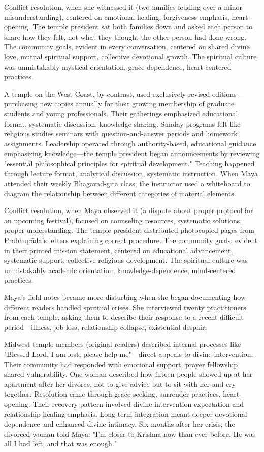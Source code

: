 \documentclass[12pt,twoside]{book}
\begin{document}
Conflict resolution, when she witnessed it (two families feuding over a minor misunderstanding), centered on emotional healing, forgiveness emphasis, heart-opening. The temple president sat both families down and asked each person to share how they felt, not what they thought the other person had done wrong. The community goals, evident in every conversation, centered on shared divine love, mutual spiritual support, collective devotional growth. The spiritual culture was unmistakably mystical orientation, grace-dependence, heart-centered practices.

A temple on the West Coast, by contrast, used exclusively revised editions—purchasing new copies annually for their growing membership of graduate students and young professionals. Their gatherings emphasized educational format, systematic discussion, knowledge-sharing. Sunday programs felt like religious studies seminars with question-and-answer periods and homework assignments. Leadership operated through authority-based, educational guidance emphasizing knowledge—the temple president began announcements by reviewing "essential philosophical principles for spiritual development." Teaching happened through lecture format, analytical discussion, systematic instruction. When Maya attended their weekly Bhagavad-gītā class, the instructor used a whiteboard to diagram the relationship between different categories of material elements.

Conflict resolution, when Maya observed it (a dispute about proper protocol for an upcoming festival), focused on counseling resources, systematic solutions, proper understanding. The temple president distributed photocopied pages from Prabhupāda's letters explaining correct procedure. The community goals, evident in their printed mission statement, centered on educational advancement, systematic support, collective religious development. The spiritual culture was unmistakably academic orientation, knowledge-dependence, mind-centered practices.

Maya's field notes became more disturbing when she began documenting how different readers handled spiritual crises. She interviewed twenty practitioners from each temple, asking them to describe their response to a recent difficult period—illness, job loss, relationship collapse, existential despair.

Midwest temple members (original readers) described internal processes like "Blessed Lord, I am lost, please help me"—direct appeals to divine intervention. Their community had responded with emotional support, prayer fellowship, shared vulnerability. One woman described how fifteen people showed up at her apartment after her divorce, not to give advice but to sit with her and cry together. Resolution came through grace-seeking, surrender practices, heart-opening. Their recovery pattern involved divine intervention expectation and relationship healing emphasis. Long-term integration meant deeper devotional dependence and enhanced divine intimacy. Six months after her crisis, the divorced woman told Maya: "I'm closer to Krishna now than ever before. He was all I had left, and that was enough."
\end{document}
